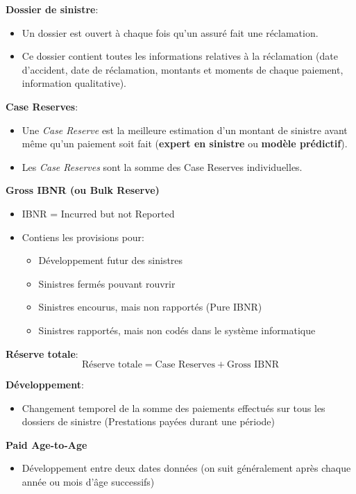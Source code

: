 \textbf{Dossier de sinistre}:
\begin{itemize}
  \item Un dossier est ouvert à chaque fois qu'un assuré fait une réclamation.
  \item Ce dossier contient toutes les informations relatives à la réclamation (date d'accident, date de réclamation, montants et moments de chaque paiement, information qualitative).
\end{itemize}

\textbf{Case Reserves}:
\begin{itemize}
  \item Une \textit{Case Reserve} est la meilleure estimation d'un montant de sinistre avant même qu'un paiement soit fait (\textbf{expert en sinistre} ou \textbf{modèle prédictif}).
  \item Les \textit{Case Reserves} sont la somme des Case Reserves individuelles.
\end{itemize}

\textbf{Gross IBNR (ou Bulk Reserve)}
\begin{itemize}
  \item IBNR = Incurred but not Reported
  \item Contiens les provisions pour:
  \begin{itemize}
    \item Développement futur des sinistres
    \item Sinistres fermés pouvant rouvrir
    \item Sinistres encourus, mais non rapportés (Pure IBNR)
    \item Sinistres rapportés, mais non codés dans le système informatique
  \end{itemize}
\end{itemize}
 
\textbf{Réserve totale}:
$$\text{Réserve totale} = \text{Case Reserves} + \text{Gross IBNR}$$

\textbf{Développement}:
\begin{itemize}
\item Changement temporel de la somme des paiements effectués sur tous les dossiers de sinistre (Prestations payées durant une période)
\end{itemize}
  
\textbf{Paid Age-to-Age}
\begin{itemize}
\item Développement entre deux dates données (on suit généralement après chaque année ou mois d'âge successifs)
\end{itemize}
 
